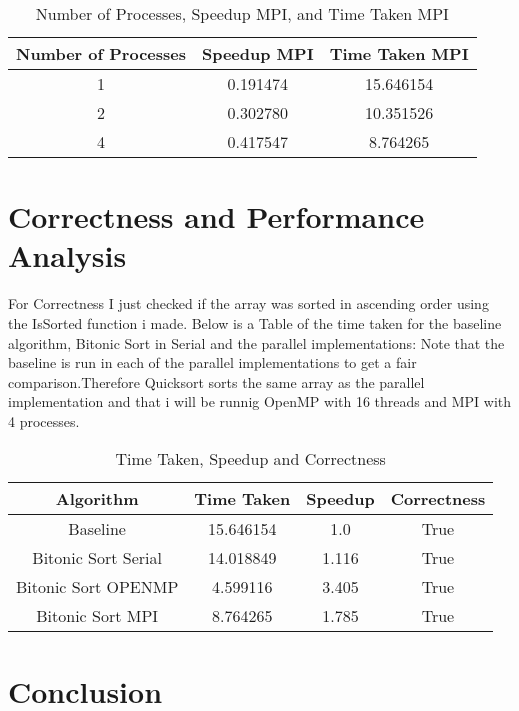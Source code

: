 \begin{table}[ht]
    \centering
    \setlength{\tabcolsep}{10pt} %
    \begin{tabular}{|c|c|c|}
        \hline
        \textbf{Number of Processes} & \textbf{Speedup MPI} & \textbf{Time
            Taken MPI}
        \\
        \hline
        1                            & 0.191474             & 15.646154
        \\
        2                            & 0.302780             & 10.351526
        \\
        4                            & 0.417547             & 8.764265
        \\
        \hline
    \end{tabular}
    \caption{Number of Processes, Speedup MPI, and Time Taken MPI}
    \label{table:2}
\end{table}
\section{Correctness and Performance Analysis}
For Correctness I just checked if the array was sorted in ascending order using the IsSorted function i made.
Below is a Table of the time taken for the baseline algorithm, Bitonic Sort in Serial and the parallel implementations: Note that the baseline is run in each of the parallel implementations to get a fair comparison.Therefore Quicksort sorts the same array as the parallel implementation and that i will be runnig OpenMP with 16 threads and MPI with 4 processes.
\begin{table}[ht]
    \centering
    \setlength{\tabcolsep}{10pt} %
    \begin{tabular}{|c|c|c|c|}
        \hline
        \textbf{Algorithm} & \textbf{Time Taken} & \textbf{Speedup} & \textbf{Correctness} \\
        \hline
        Baseline            & 15.646154          & 1.0             & True                 \\
        Bitonic Sort Serial & 14.018849          & 1.116            & True                 \\
        Bitonic Sort OPENMP & 4.599116           & 3.405            & True                 \\
        Bitonic Sort MPI    & 8.764265           & 1.785            & True                 \\
        \hline
    \end{tabular}
    \caption{Time Taken, Speedup and Correctness}
    \label{table:3} 
\end{table}


\section{Conclusion}

